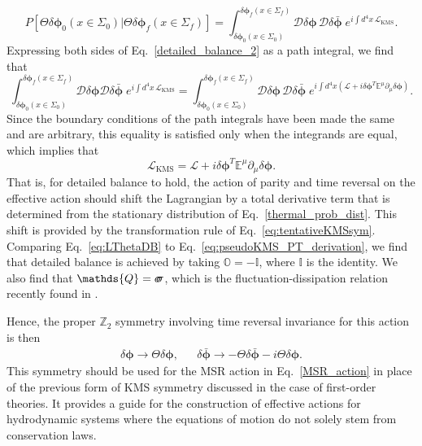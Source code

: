 \documentclass[aps,prd,nofootinbib,amsmath,amssymb,showpacs,longbibliography,singlecolumn,superscriptaddress,notitlepage]{revtex4-1}
\theoremstyle{plain}
\theoremstyle{definition}
\newcommand*{\Scale}[2][4]{\scalebox{#1}{$#2$}}%
\newcommand{\forceds}[1]{\Scale[1.1]{\ensuremath{\mathrlap{{{#1}}}\hspace{1.4pt}#1}}}
\newcommand{\cvec}[1]{\ensuremath{\bm {#1}}}
\newcommand{\cmat}[1]{\ensuremath{\mathds{{#1}}}}
\newcommand{\cmatgreek}[1]{\ensuremath{\forceds{{#1}}}}
\begin{document}
\begin{equation}
    P[\Theta \delta \cvec{\phi}_0(x \in \Sigma_0) | \Theta \delta \cvec{\phi}_f(x \in \Sigma_f)] = \int_{\delta \cvec{\phi}_0(x \in \Sigma_0) 
    }^{\delta \cvec{\phi}_f(x \in \Sigma_f) 
    } \mathcal{D} \delta \cvec{\phi}\, \mathcal{D} \delta \bar{\cvec{\phi}} \;e^{i \int d^4x\, \mathcal{L}_{\mathrm{KMS}}} .
\end{equation}
Expressing both sides of Eq.\ \eqref{detailed_balance_2} as a path integral, we find that 
\begin{equation}
    \int_{\delta \cvec{\phi}_0(x \in \Sigma_0) 
    }^{\delta \cvec{\phi}_f(x \in \Sigma_f) 
    } \mathcal{D} \delta \cvec{\phi} \mathcal{D} \delta \bar{\cvec{\phi}} \;e^{i \int d^4x \,\mathcal{L}_{\mathrm{KMS}}} = \int_{\delta \cvec{\phi}_0(x \in \Sigma_0) 
    }^{\delta \cvec{\phi}_f(x \in \Sigma_f) 
    } \mathcal{D} \delta \cvec{\phi}\, \mathcal{D} \delta \bar{\cvec{\phi}} \;e^{i \int d^4x \left( \mathcal{L} + i \delta \cvec{\phi}^T \cmat{E}^{\mu} \partial_{\mu} \delta \cvec{\phi} \right)} .
\end{equation}
Since the boundary conditions of the path integrals have been made the same and are arbitrary, this equality is satisfied only when the integrands are equal, which implies that 
\begin{equation}
\label{eq:LThetaDB}
    \mathcal{L}_{\mathrm{KMS}} = \mathcal{L} + i \delta \cvec{\phi}^T \cmat{E}^{\mu} \partial_{\mu} \delta \cvec{\phi} .
\end{equation}
That is, for detailed balance to hold, the action of parity and time reversal on the effective action should shift the Lagrangian by a total derivative term that is determined from the stationary distribution of Eq.\ \eqref{thermal_prob_dist}. 
This shift is provided by the transformation rule of Eq.\ \eqref{eq:tentativeKMSsym}. 
Comparing Eq.~\eqref{eq:LThetaDB} to Eq.~\eqref{eq:pseudoKMS_PT_derivation}, we find that detailed balance  is achieved by taking $\cmat{O}=-\cmat{I}$, where \cmat{I} is the identity. We also find that $\cmat{Q} = \cmatgreek{\sigma}$, which is the fluctuation-dissipation relation recently found in \cite{Mullins:2023tjg}. 

Hence, the proper $\mathds{Z}_2$ symmetry involving time reversal invariance for this action is then
\begin{align} \label{reduced_KMS_transform}
    &\delta \cvec{\phi} \rightarrow \Theta \delta \cvec{\phi} ,& 
    & \delta \bar{\cvec{\phi}} \rightarrow - \Theta \delta \bar{\cvec{\phi}} - i \Theta \delta \cvec{\phi} .&
\end{align} 
This symmetry should be used for the MSR action in Eq.\ \eqref{MSR_action} in place of the previous form of KMS symmetry discussed in the case of first-order theories. It provides a guide for the construction of effective actions for hydrodynamic systems where the equations of motion do not solely stem from conservation laws. 
\end{document}
